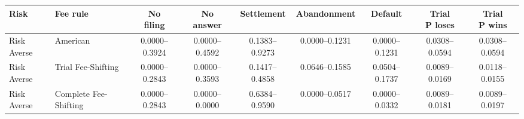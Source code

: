 \documentclass[10pt,border=5pt]{standalone}
\begin{document}
\begin{tabular}{llccccccc}
\toprule Risk & Fee rule & \shortstack{No\\filing} & \shortstack{No\\answer} & Settlement & Abandonment & Default & \shortstack{Trial\\P loses} & \shortstack{Trial\\P wins} \\
\midrule
Risk Averse & American & 0.0000--0.3924 & 0.0000--0.4592 & 0.1383--0.9273 & 0.0000--0.1231 & 0.0000--0.1231 & 0.0308--0.0594 & 0.0308--0.0594 \\
Risk Averse & Trial Fee-Shifting & 0.0000--0.2843 & 0.0000--0.3593 & 0.1417--0.4858 & 0.0646--0.1585 & 0.0504--0.1737 & 0.0089--0.0169 & 0.0118--0.0155 \\
Risk Averse & Complete Fee-Shifting & 0.0000--0.2843 & 0.0000--0.0000 & 0.6384--0.9590 & 0.0000--0.0517 & 0.0000--0.0332 & 0.0089--0.0181 & 0.0089--0.0197 \\
\bottomrule\end{tabular}
\end{document}
